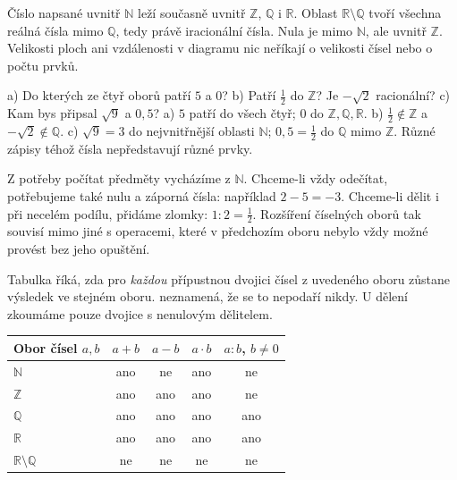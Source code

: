 \documentclass[11pt,a4paper]{article}
\begin{document}
Číslo napsané uvnitř $\mathbb N$ leží současně uvnitř $\mathbb Z$,
$\mathbb Q$ i $\mathbb R$. Oblast $\mathbb R\setminus\mathbb Q$ tvoří
všechna reálná čísla mimo $\mathbb Q$, tedy právě iracionální čísla.
Nula je mimo $\mathbb N$, ale uvnitř $\mathbb Z$.
Velikosti ploch ani vzdálenosti v diagramu nic neříkají o velikosti
čísel nebo o počtu prvků.

\begin{prikladReseniBox}[title={Příklad 2},breakable=false]
a) Do kterých ze čtyř oborů patří $5$ a $0$?
b) Patří $\frac12$ do $\mathbb Z$? Je $-\sqrt2$ racionální?
c) Kam bys připsal $\sqrt9$ a $0{,}5$?
\tcblower
a) $5$ patří do všech čtyř; $0$ do $\mathbb Z,\mathbb Q,\mathbb R$.
b) $\frac12\notin\mathbb Z$ a $-\sqrt2\notin\mathbb Q$.
c) $\sqrt9=3$ do nejvnitřnější oblasti $\mathbb N$;
$0{,}5=\frac12$ do $\mathbb Q$ mimo $\mathbb Z$.
Různé zápisy téhož čísla nepředstavují různé prvky.
\end{prikladReseniBox}


\newpage
{}
Z potřeby počítat předměty vycházíme z $\mathbb N$. Chceme-li vždy
odečítat, potřebujeme také nulu a záporná čísla: například $2-5=-3$.
Chceme-li dělit i při necelém podílu, přidáme zlomky: $1:2=\frac12$.
Rozšíření číselných oborů tak souvisí mimo jiné s operacemi,
které v předchozím oboru nebylo vždy možné provést bez jeho opuštění.

Tabulka říká, zda pro \emph{každou} přípustnou dvojici čísel z uvedeného
oboru zůstane výsledek ve stejném oboru.  neznamená, že se to
nepodaří nikdy. U dělení zkoumáme pouze dvojice s nenulovým dělitelem.

\begin{center}
\begin{tabular}{lcccc}
\toprule
Obor čísel $a,b$ & $a+b$ & $a-b$ & $a\cdot b$ & $a:b$, $b\ne0$\\
\midrule
$\mathbb N$ & ano & ne & ano & ne\\
$\mathbb Z$ & ano & ano & ano & ne\\
$\mathbb Q$ & ano & ano & ano & ano\\
$\mathbb R$ & ano & ano & ano & ano\\
$\mathbb R\setminus\mathbb Q$ & ne & ne & ne & ne\\
\bottomrule
\end{tabular}
\end{center}
\end{document}
